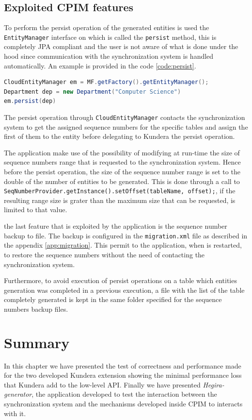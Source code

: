 \subsection{Exploited CPIM features}
To perform the persist operation of the generated entities is used the \texttt{EntityManager} interface on which is called the \texttt{persist} method, this is completely JPA compliant and the user is not aware of what is done under the hood since communication with the synchronization system is handled automatically. An example is provided in the code \ref{code:persist}.

\begin{lstlisting}[language=Java, caption=Persisting entities in CPIM, label=code:persist]
CloudEntityManager em = MF.getFactory().getEntityManager();
Department dep = new Department("Computer Science")
em.persist(dep)
\end{lstlisting}

\noindent The persist operation through \texttt{CloudEntityManager} contacts the synchronization system to get the assigned sequence numbers for the specific tables and assign the first of them to the entity before delegating to Kundera the persist operation.

\newparagraph The application make use of the possibility of modifying at run-time the size of sequence numbers range that is requested to the synchronization system. Hence before the persist operation, the size of the sequence number range is set to the double of the number of entities to be generated. This is done through a call to \texttt{SeqNumberProvider.getInstance().setOffset(tableName, offset);}, if the resulting range size is grater than the maximum size that can be requested, is limited to that value. 

\newparagraph the last feature that is exploited by the application is the sequence number backup to file. The backup is configured in the \texttt{migration.xml} file as described in the appendix \ref{app:migration}.
This permit to the application, when is restarted, to restore the sequence numbers without the need of contacting the synchronization system.

\noindent Furthermore, to avoid execution of persist operations on a table which entities generation was completed in a previous execution, a file with the list of the table completely generated is kept in the same folder specified for the sequence numbers backup files.

\section{Summary}
In this chapter we have presented the test of correctness and performance made for the two developed Kundera extension showing the minimal performance loss that Kundera add to the low-level API.
Finally we have presented \textit{Hegira-generator}, the application developed to test the interaction between the synchronization system and the mechanisms developed inside CPIM to interacts with it.
